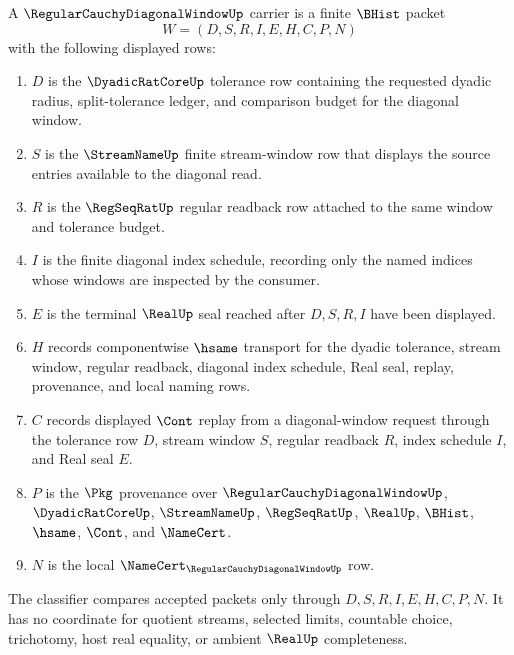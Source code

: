 \begin{definition}
\label{def:regular-cauchy-diagonal-window-carrier}
A $\RegularCauchyDiagonalWindowUp$ carrier is a finite $\BHist$ packet
$$
W=(D,S,R,I,E,H,C,P,N)
$$
with the following displayed rows:
\begin{enumerate}
\item $D$ is the $\DyadicRatCoreUp$ tolerance row containing the requested dyadic radius, split-tolerance ledger, and comparison budget for the diagonal window.
\item $S$ is the $\StreamNameUp$ finite stream-window row that displays the source entries available to the diagonal read.
\item $R$ is the $\RegSeqRatUp$ regular readback row attached to the same window and tolerance budget.
\item $I$ is the finite diagonal index schedule, recording only the named indices whose windows are inspected by the consumer.
\item $E$ is the terminal $\RealUp$ seal reached after $D,S,R,I$ have been displayed.
\item $H$ records componentwise $\hsame$ transport for the dyadic tolerance, stream window, regular readback, diagonal index schedule, Real seal, replay, provenance, and local naming rows.
\item $C$ records displayed $\Cont$ replay from a diagonal-window request through the tolerance row $D$, stream window $S$, regular readback $R$, index schedule $I$, and Real seal $E$.
\item $P$ is the $\Pkg$ provenance over $\RegularCauchyDiagonalWindowUp$, $\DyadicRatCoreUp$, $\StreamNameUp$, $\RegSeqRatUp$, $\RealUp$, $\BHist$, $\hsame$, $\Cont$, and $\NameCert$.
\item $N$ is the local $\NameCert_{\RegularCauchyDiagonalWindowUp}$ row.
\end{enumerate}
The classifier compares accepted packets only through $D,S,R,I,E,H,C,P,N$. It has no coordinate for quotient streams, selected limits, countable choice, trichotomy, host real equality, or ambient $\RealUp$ completeness.
\end{definition}

